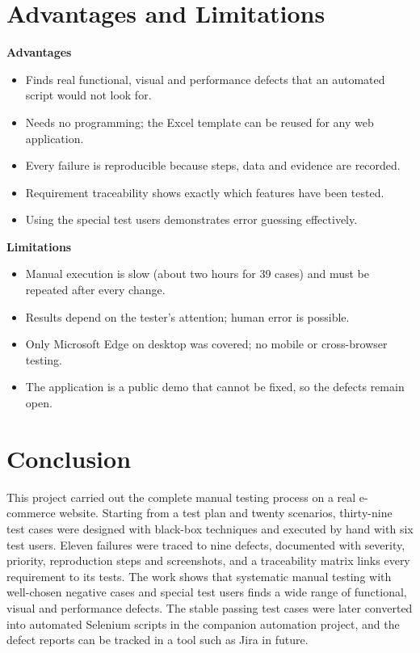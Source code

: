 \documentclass[12pt,a4paper]{article}
\begin{document}
\section{Advantages and Limitations}\label{sec:adv}
\textbf{Advantages}
\begin{itemize}[nosep]
  \item Finds real functional, visual and performance defects that an automated script would not look for.
  \item Needs no programming; the Excel template can be reused for any web application.
  \item Every failure is reproducible because steps, data and evidence are recorded.
  \item Requirement traceability shows exactly which features have been tested.
  \item Using the special test users demonstrates error guessing effectively.
\end{itemize}
\textbf{Limitations}
\begin{itemize}[nosep]
  \item Manual execution is slow (about two hours for 39 cases) and must be repeated after every change.
  \item Results depend on the tester's attention; human error is possible.
  \item Only Microsoft Edge on desktop was covered; no mobile or cross-browser testing.
  \item The application is a public demo that cannot be fixed, so the defects remain open.
\end{itemize}

\section{Conclusion}\label{sec:concl}
This project carried out the complete manual testing process on a real e-commerce website. Starting from a test plan and twenty scenarios, thirty-nine test cases were designed with black-box techniques and executed by hand with six test users. Eleven failures were traced to nine defects, documented with severity, priority, reproduction steps and screenshots, and a traceability matrix links every requirement to its tests. The work shows that systematic manual testing with well-chosen negative cases and special test users finds a wide range of functional, visual and performance defects. The stable passing test cases were later converted into automated Selenium scripts in the companion automation project, and the defect reports can be tracked in a tool such as Jira in future.
\end{document}

